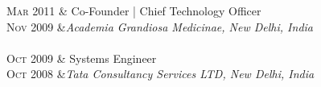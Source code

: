 \begin{longtable}
	\textsc{Mar 2011} & Co-Founder | Chief Technology Officer\\
	\textsc{Nov 2009} &\emph{Academia Grandiosa Medicinae, New Delhi, India}\\
	 \\

	\textsc{Oct 2009} & Systems Engineer\\
	\textsc{Oct 2008} &\emph{Tata Consultancy Services LTD, New Delhi, India}\\
	 \\

\end{longtable}
\pagebreak
